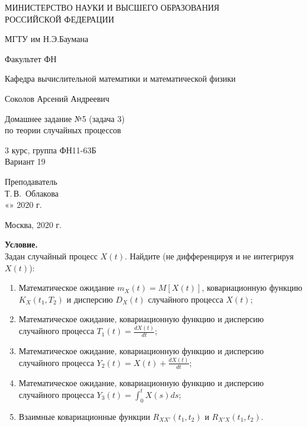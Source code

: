\documentclass[12 pt]{article}
\begin{document}
\begin{titlepage}
	\begin{center}
		\large
		МИНИСТЕРСТВО НАУКИ И ВЫСШЕГО ОБРАЗОВАНИЯ\\ РОССИЙСКОЙ ФЕДЕРАЦИИ
		
		\vspace{0.5cm}
		
		МГТУ им Н.Э.Баумана
		\vspace{0.25cm}
		
		Факультет ФН
		
		Кафедра вычислительной математики и математической физики
		\vfill
		
		
		Соколов Арсений Андреевич\\
		\vfill
		
		
		{\LARGE Домашнее задание №5 (задача 3) \\ по теории случайных процессов\\[2mm]
		}
		\bigskip
		
		3 курс, группа ФН11-63Б\\
		Вариант 19
	\end{center}
	\vfill
	
	\newlength{\ML}
	\hfill\begin{minipage}{0.4\textwidth}
		Преподаватель\\
		\underline{\hspace{3cm}} Т.\,В.~Облакова\\
		«\underline{\hspace{0.7cm}}» \underline{\hspace{1.71cm}} 2020 г.
	\end{minipage}%
	\bigskip
	
	
	\vfill
	
	\begin{center}
		Москва, 2020 г.
	\end{center}
\end{titlepage}
	
\textbf{Условие.}\\
Задан случайный процесс $X(t)$. Найдите (не дифференцируя и не интегрируя $X(t)$):
\begin{enumerate}
	\item Математическое ожидание $m_X(t) = M[X(t)]$, ковариационную функцию $K_X(t_1,T_2)$ и дисперсию $D_X(t)$ случайного процесса $X(t)$;
	\item Математическое ожидание, ковариационную функцию и дисперсию случайного процесса $T_1(t) = \frac{dX(t)}{dt}$;
	\item Математическое ожидание, ковариационную функцию и дисперсию случайного процесса $Y_2(t) = X(t) + \frac{dX(t)}{dt}$;
	\item Математическое ожидание, ковариационную функцию и дисперсию случайного процесса $Y_3(t) = \int_{0}^{t}X(s)ds$;
	\item Взаимные ковариационные функции $R_{XX'}(t_1,t_2)$ и $R_{X'X}(t_1,t_2)$.
\end{enumerate}
	
\end{document}
